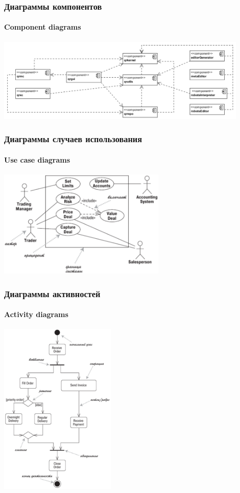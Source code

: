 \documentclass[xetex,mathserif,serif]{beamer}
\begin{document}
	\begin{frame}
		\frametitle{Диаграммы компонентов}
		\framesubtitle{Component diagrams}
		\begin{center}
			\includegraphics[width=0.9\textwidth]{componentDiagram.png}
		\end{center}
	\end{frame}

	\begin{frame}
		\frametitle{Диаграммы случаев использования}
		\framesubtitle{Use case diagrams}
		\begin{center}
			\includegraphics[width=0.6\textwidth]{useCaseDiagram.png}
		\end{center}
	\end{frame}

	\begin{frame}
		\frametitle{Диаграммы активностей}
		\framesubtitle{Activity diagrams}
		\begin{center}
			\includegraphics[width=0.415\textwidth]{activityDiagram.png}
		\end{center}
	\end{frame}
\end{document}
